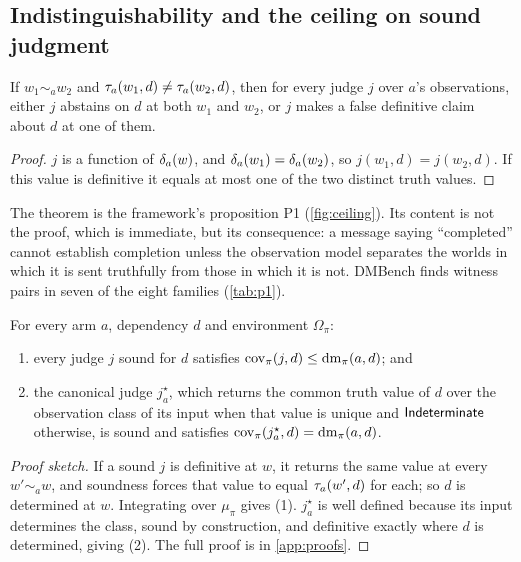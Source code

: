 \subsection{Indistinguishability and the ceiling on sound judgment}

\begin{theorem}[Indistinguishability]
\label{thm:p1}
If $w_1 \sim_a w_2$ and $\tau_a(w_1, d) \neq \tau_a(w_2, d)$, then for every judge $j$ over $a$'s observations, either $j$ abstains on $d$ at both $w_1$ and $w_2$, or $j$ makes a false definitive claim about $d$ at one of them.
\end{theorem}

\begin{proof}
$j$ is a function of $\delta_a(w)$, and $\delta_a(w_1) = \delta_a(w_2)$, so $j(w_1, d) = j(w_2, d)$. If this value is definitive it equals at most one of the two distinct truth values.
\end{proof}

The theorem is the framework's proposition P1 (\cref{fig:ceiling}). Its content is not the proof, which is immediate, but its consequence: a message saying ``completed'' cannot establish completion unless the observation model separates the worlds in which it is sent truthfully from those in which it is not. DMBench finds witness pairs in seven of the eight families (\cref{tab:p1}).

\begin{theorem}
\label{thm:ceiling}
For every arm $a$, dependency $d$ and environment $\Omega_\pi$:
\begin{enumerate}
\item every judge $j$ sound for $d$ satisfies $\operatorname{cov}_\pi(j, d) \leq \operatorname{dm}_\pi(a, d)$; and
\item the canonical judge $j^\star_a$, which returns the common truth value of $d$ over the observation class of its input when that value is unique and $\mathsf{Indeterminate}$ otherwise, is sound and satisfies $\operatorname{cov}_\pi(j^\star_a, d) = \operatorname{dm}_\pi(a, d)$.
\end{enumerate}
\end{theorem}

\begin{proof}[Proof sketch]
If a sound $j$ is definitive at $w$, it returns the same value at every $w' \sim_a w$, and soundness forces that value to equal $\tau_a(w', d)$ for each; so $d$ is determined at $w$. Integrating over $\mu_\pi$ gives (1). $j^\star_a$ is well defined because its input determines the class, sound by construction, and definitive exactly where $d$ is determined, giving (2). The full proof is in \cref{app:proofs}.
\end{proof}

